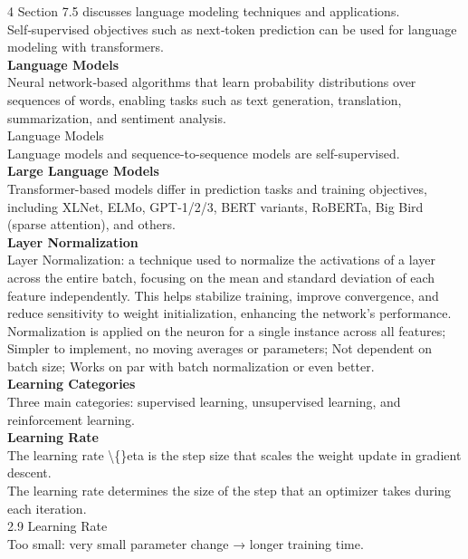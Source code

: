 \documentclass[8pt]{extarticle}
\begin{document}
\begin{multicols}{4}
Section 7.5 discusses language modeling techniques and applications.\\
Self‑supervised objectives such as next‑token prediction can be used for language modeling with transformers.\\
\vspace{2pt}\textbf{Language Models}\\
Neural network‑based algorithms that learn probability distributions over sequences of words, enabling tasks such as text generation, translation, summarization, and sentiment analysis.\\
Language Models\\
Language models and sequence-to-sequence models are self-supervised.\\
\vspace{2pt}\textbf{Large Language Models}\\
Transformer-based models differ in prediction tasks and training objectives, including XLNet, ELMo, GPT‑1/2/3, BERT variants, RoBERTa, Big Bird (sparse attention), and others.\\
\vspace{2pt}\textbf{Layer Normalization}\\
Layer Normalization: a technique used to normalize the activations of a layer across the entire batch, focusing on the mean and standard deviation of each feature independently. This helps stabilize training, improve convergence, and reduce sensitivity to weight initialization, enhancing the network’s performance.\\
Normalization is applied on the neuron for a single instance across all features; Simpler to implement, no moving averages or parameters; Not dependent on batch size; Works on par with batch normalization or even better.\\
\vspace{2pt}\textbf{Learning Categories}\\
Three main categories: supervised learning, unsupervised learning, and reinforcement learning.\\
\vspace{2pt}\textbf{Learning Rate}\\
The learning rate \textbackslash\{\}eta is the step size that scales the weight update in gradient descent.\\
The learning rate determines the size of the step that an optimizer takes during each iteration.\\
2.9 Learning Rate\\
Too small: very small parameter change → longer training time.\\

\end{multicols}
\end{document}
